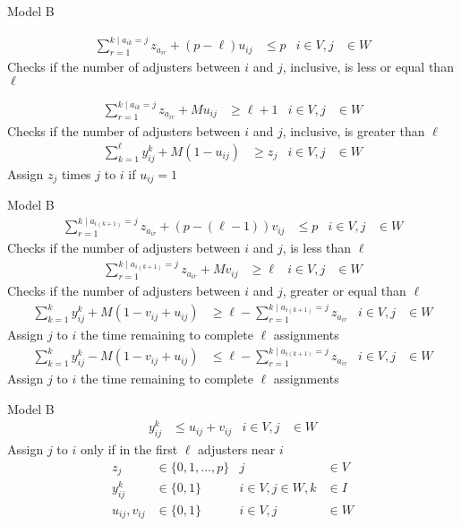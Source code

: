 \begin{frame}{Model B}{}
{\footnotesize
  \begin{align}
    \sum_{r = 1}^{k \mid a_{ik}=j}{z_{a_{ir}}} + (p-\ell) u_{ij} & \leq p &  i \in V, j &\in W
  \end{align}
  Checks if the number of adjusters between $i$ and $j$, inclusive, is less or equal than $\ell$

  \begin{align}
    \sum_{r = 1}^{k \mid a_{ik}=j}{z_{a_{ir}}} + M u_{ij} & \geq \ell+1   &  i \in V, j &\in W
  \end{align} 
  Checks if the number of adjusters between $i$ and $j$, inclusive, is greater than $\ell$ \\

  \begin{align}
    \sum_{k = 1}^{\ell}{y_{ij}^{k}} + M (1 - u_{ij}) & \geq z_j           &  i \in V, j &\in W
  \end{align}
  Assign $z_j$ times $j$ to $i$ if $u_{ij} = 1$
}
\end{frame}

\begin{frame}{Model B}{}
{\scriptsize
  \begin{align}
    \sum_{r = 1}^{k \mid a_{i(k+1)}=j}{z_{a_{ir}}} + (p-(\ell-1)) v_{ij} & \leq p &  i \in V, j &\in W
  \end{align}
  Checks if the number of adjusters between $i$ and $j$, is less than $\ell$
  \begin{align}
    \sum_{r = 1}^{k \mid a_{i(k+1)}=j}{z_{a_{ir}}} + M v_{ij} & \geq \ell &  i \in V, j &\in W
  \end{align}
  Checks if the number of adjusters between $i$ and $j$, greater or equal than $\ell$
  \begin{align}
    \sum_{k=1}^{k}{y_{ij}^{k}} + M (1 - v_{ij} + u_{ij}) & \geq \ell - \sum_{r = 1}^{k \mid a_{i(k+1)}=j}{z_{a_{ir}}} &  i \in V, j &\in W
  \end{align}
  Assign $j$ to $i$ the time remaining to complete $\ell$ assignments  
  \begin{align}
    \sum_{k=1}^{k}{y_{ij}^{k}} - M (1 - v_{ij} + u_{ij}) & \leq \ell - \sum_{r = 1}^{k \mid a_{i(k+1)}=j}{z_{a_{ir}}} &  i \in V, j &\in W
  \end{align}
  Assign $j$ to $i$ the time remaining to complete $\ell$ assignments
}
\end{frame}

\begin{frame}[allowframebreaks]{Model B}{}
{\footnotesize
  \begin{align}
    y_{ij}^{k} & \leq u_{ij} + v_{ij}  &        i \in V,j &\in W
  \end{align}
  Assign $j$ to $i$ only if in the first $\ell$ adjusters near $i$
  \begin{align}
    z_j & \in \{0,1,\ldots,p\}         &                j &\in V \nonumber\\
    y_{ij}^{k} & \in \{0,1\}           &  i\in V,j\in W,k &\in I \nonumber\\
    u_{ij},v_{ij} & \in \{0,1\}        &        i \in V,j &\in W \nonumber
  \end{align}
}
\end{frame}
